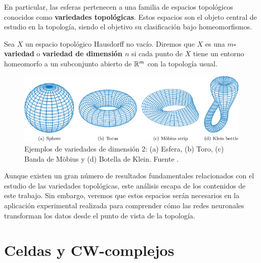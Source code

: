 En particular, las esferas pertenecen a una familia de espacios topológicos
conocidos como \textbf{variedades topológicas}. Estos espacios son el objeto
central de estudio en la topología, siendo el objetivo su clasificación bajo homeomorfismos.

\begin{definicion}
	Sea $X$ un espacio topológico Hausdorff no vacío. Diremos que $X$ es una
	\textbf{$m$-variedad} o \textbf{variedad de dimensión $n$} si cada punto de
	$X$ tiene un entorno homeomorfo a un subconjunto abierto de $\mathbb{R}^{m}$ con la
	topología usual.%
\end{definicion}

\begin{figure}[h]
	\centering
	\includegraphics[width=120mm]{img/manifolds.jpg}
	\caption{Ejemplos de variedades de dimensión 2: (a) Esfera, (b) Toro, (c) Banda
		de Möbius y (d) Botella de Klein. Fuente \cite{deng2020topology}.}
\end{figure}

Aunque existen un gran número de resultados fundamentales relacionados con el estudio
de las variedades topológicas, este análisis escapa de los contenidos de este
trabajo. Sin embargo, veremos que estos espacios serán necesarios en la
aplicación experimental realizada para comprender cómo las redes neuronales
transforman los datos desde el punto de vista de la topología.

\section{Celdas y CW-complejos}

